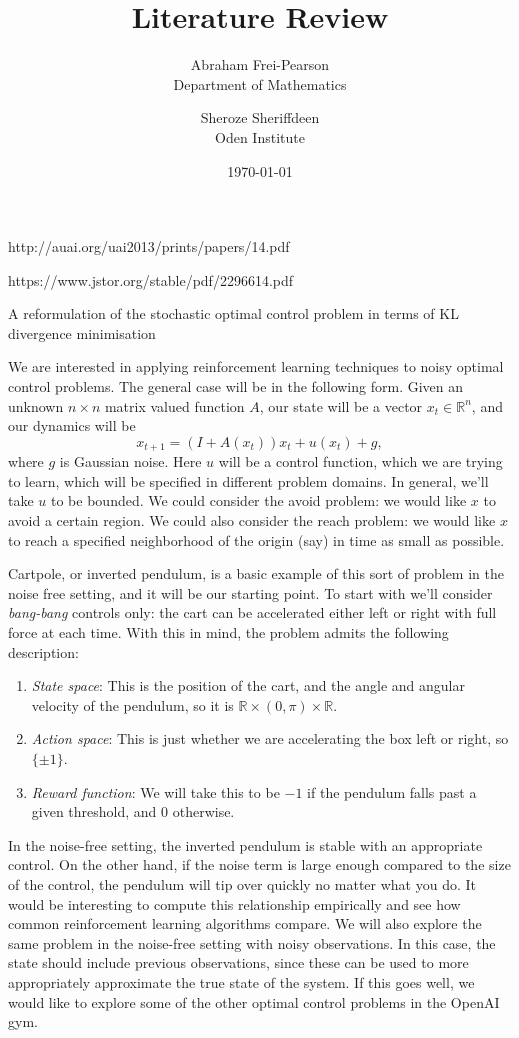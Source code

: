 \documentclass{article}
\title{Literature Review}
\author{Abraham Frei-Pearson \\
	Department of Mathematics  \\
	\and 
	Sheroze Sheriffdeen \\
	Oden Institute \\
	}
\date{\today}
\begin{document}
\maketitle

http://auai.org/uai2013/prints/papers/14.pdf

https://www.jstor.org/stable/pdf/2296614.pdf

A reformulation of the stochastic optimal control problem in terms of KL divergence minimisation \cite{rawlik2013stochastic}

We are interested in applying reinforcement learning techniques to noisy optimal control problems. The general case will be in the following form. Given an unknown $n \times n$ matrix valued function $A$, our state will be a vector $x_t \in \mathbb R^n$, and our dynamics will be
\[
    x_{t+1} = (I + A(x_t)) x_t + u(x_t) + g,
\]
where $g$ is Gaussian noise. Here $u$ will be a control function, which we are trying to learn, which will be specified in different problem domains. In general, we'll take $u$ to be bounded. We could consider the avoid problem: we would like $x$ to avoid a certain region. We could also consider the reach problem: we would like $x$ to reach a specified neighborhood of the origin (say) in time as small as possible.

Cartpole, or inverted pendulum, is a basic example of this sort of problem in the noise free setting, and it will be our starting point. To start with we'll consider {\em bang-bang} controls only: the cart can be accelerated either left or right with full force at each time. With this in mind, the problem admits the following description:
\begin{enumerate}
    \item []{\em State space}: This is the position of the cart, and the angle and angular velocity of the pendulum, so it is $\mathbb R \times (0,\pi) \times \mathbb R$.
    \item []{\em Action space}: This is just whether we are accelerating the box left or right, so $\{\pm 1\}$.
    \item []{\em Reward function}: We will take this to be $-1$ if the pendulum falls past a given threshold, and $0$ otherwise.
\end{enumerate}

In the noise-free setting, the inverted pendulum is stable with an appropriate control. On the other hand, if the noise term is large enough compared to the size of the control, the pendulum will tip over quickly no matter what you do. It would be interesting to compute this relationship empirically and see how common reinforcement learning algorithms compare.
We will also explore the same problem in the noise-free setting with noisy observations. In this case, the state should include previous observations, since these can be used to more appropriately approximate the true state of the system.
If this goes well, we would like to explore some of the other optimal control problems in the OpenAI gym.
\end{document}
